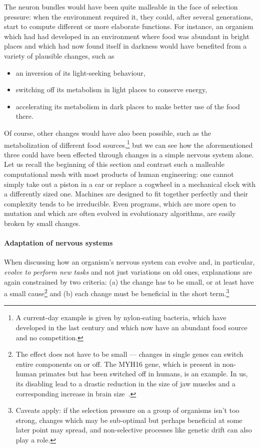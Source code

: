 The neuron bundles would have been quite malleable in the face of selection pressure: when the environment required it, they could, after several generations, start to compute different or more elaborate functions. For instance, an organism which had had developed in an environment where food was abundant in bright places and which had now found itself in darkness would have benefited from a variety of plausible changes, such as
\begin{itemize}
	\item an inversion of its light-seeking behaviour,
	\item switching off its metabolism in light places to conserve energy,
	\item accelerating its metabolism in dark places to make better use of the food there.
\end{itemize}

Of course, other changes would have also been possible, such as the metabolization of different food sources,\footnote{A current-day example is given by nylon-eating bacteria, which have developed in the last century and which now have an abundant food source and no competition.} but we can see how the aforementioned three could have been effected through changes in a simple nervous system alone. Let us recall the beginning of this section and contrast such a malleable computational mesh with most products of human engineering: one cannot simply take out a piston in a car or replace a cogwheel in a mechanical clock with a differently sized one. Machines are designed to fit together perfectly and their complexity tends to be irreducible. Even programs, which are more open to mutation and which are often evolved in evolutionary algorithms, are easily broken by small changes.

\paragraph{Adaptation of nervous systems}  When discussing how an organism's nervous system can evolve and, in particular, {\em evolve to perform new tasks} and not just variations on old ones, explanations are again constrained by two criteria: (a) the change has to be small, or at least have a small cause\footnote{The effect does not have to be small --- changes in single genes can switch entire components on or off. The MYH16 gene, which is present in non-human primates but has been switched off in humans, is an example. In us, its disabling lead to a drastic reduction in the size of jaw muscles and a corresponding increase in brain size~\cite{carroll2005}.} and (b) each change must be beneficial in the short term.\footnote{Caveats apply: if the selection pressure on a group of organisms isn't too strong, changes which may be sub-optimal but perhaps beneficial at some later point may spread, and non-selective processes like genetic drift can also play a role.}

